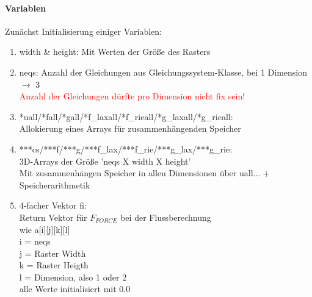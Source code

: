 \documentclass[12pt]{article}
\begin{document}
\paragraph{Variablen}
Zunächst Initialisierung einiger Variablen:
\begin{enumerate}
	\item width \& height: Mit Werten der Größe des Rasters
	\item neqs: Anzahl der Gleichungen aus Gleichungssystem-Klasse, bei 1 Dimension $\rightarrow$ 3\\
	\textcolor{red}{Anzahl der Gleichungen dürfte pro Dimension nicht fix sein!}
	\item *uall/*fall/*gall/*f\_laxall/*f\_rieall/*g\_laxall/*g\_rieall: 
	\\Allokierung eines Arrays für zusammenhängenden Speicher
	\item ***cs/***f/***g/***f\_lax/***f\_rie/***g\_lax/***g\_rie: 
	\\3D-Arrays der Größe 'neqs X width X height'
	\\Mit zusammenhängen Speicher in allen Dimensionen über uall... + Speicherarithmetik
	\item 4-facher Vektor fi: 
	\\ Return Vektor für $F_{FORCE}$ bei der Flussberechnung
	\\ wie a[i][j][k][l]
	\\ i = neqs
	\\ j = Raster Width
	\\ k = Raster Heigth
	\\ l = Dimension, also 1 oder 2
	\\ alle Werte initialisiert mit 0.0
\end{enumerate}

\renewcommand{\labelenumi}{\theenumi.} 
\end{document}

